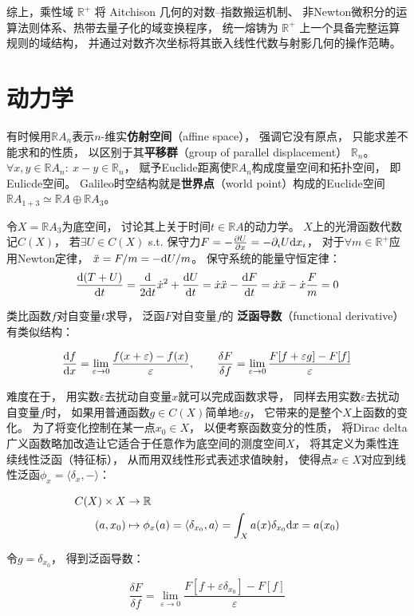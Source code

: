 ﻿\documentclass[10pt,a4paper]{article}
\numberwithin{equation}{section}
\begin{document}
综上，乘性域 $\boxed{\mathbb R^+}$ 将 Aitchison 几何的对数--指数搬运机制、
非Newton微积分的运算法则体系、热带去量子化的域变换程序，
统一熔铸为 $\mathbb R^+$ 上一个具备完整运算规则的域结构，
并通过对数齐次坐标将其嵌入线性代数与射影几何的操作范畴。


\section{动力学}

有时候用$\mathbb RA_n$表示$n$-维实\textbf{仿射空间}（affine space），
强调它没有原点，
只能求差不能求和的性质，
以区别于其\textbf{平移群}（group of parallel displacement）
$\mathbb R_n$。
$\forall x,y\in \mathbb RA_n:\ x - y \in \mathbb R_n$，
赋予Euclide距离使$\mathbb RA_n$构成度量空间和拓扑空间，
即Eulicde空间。
Galileo时空结构就是\textbf{世界点}（world point）构成的Euclide空间
$\mathbb RA_{1+3} \simeq \mathbb RA \oplus \mathbb RA_3$。

令$X = \mathbb RA_3$为底空间，
讨论其上关于时间$t \in \mathbb RA$的动力学。
$X$上的光滑函数代数记$C(X)$，
若$\exists U \in C(X)$
s.t.
保守力$F = - \frac{\partial U}{\partial x} = - \partial_i U \text d x_i$，
对于$\forall m \in \mathbb R^+$应用Newton定律，
$\ddot x = F/m = - \text dU/m$。
保守系统的能量守恒定律：
$$
\frac{\text d(T + U)}{\text dt}
=\frac{\text d}{2 \text dt} \dot x^2 + \frac{\text d U}{\text dt}
= \dot x \ddot x - \frac{\text dF}{\text dt}
= \dot x \ddot x - \dot x \frac{F}{m}
= 0
$$

\begin{framed}

类比函数$f$对自变量$t$求导，
泛函$F$对自变量$f$的
\textbf{泛函导数}（functional derivative）有类似结构：

$$
\frac{\text df}{\text dx} = \lim_{\varepsilon \to 0}
\frac{f(x + \varepsilon) - f(x)}{\varepsilon},
\qquad
\frac{\delta F}{\delta f} = \lim_{\varepsilon \to 0}
\frac{F[f + \varepsilon g] - F[f]}{\varepsilon}
$$

难度在于，
用实数$\varepsilon$去扰动自变量$x$就可以完成函数求导，
同样去用实数$\varepsilon$去扰动自变量$f$时，
如果用普通函数$g\in C(X)$简单地$\varepsilon g$，
它带来的是整个$X$上函数的变化。
为了将变化控制在某一点$x_0 \in X$，
以便考察函数变分的性质，
将Dirac delta广义函数略加改造让它适合于任意作为底空间的测度空间$X$，
将其定义为乘性连续线性泛函（特征标），
从而用双线性形式表述求值映射，
使得点$x \in X$对应到线性泛函$\phi_x = \langle \delta_x, - \rangle$：

$$
\begin{aligned}
C(X) \times X &\to \mathbb R \\
(a,x_0) &\mapsto \phi_x(a) = \langle \delta_{x_0}, a \rangle 
= \int_X a(x)\delta_{x_0} \text dx = a(x_0) \\
\end{aligned}
$$

令$g = \delta_{x_0}$，
得到泛函导数：

\begin{equation}
\frac{\delta F}{\delta f} = \lim_{\varepsilon \to 0}
\frac{F[f + \varepsilon \delta_{x_0}] - F[f]}{\varepsilon}
\label{eq:functional-derivative}
\end{equation}

\end{framed}
\end{document}
